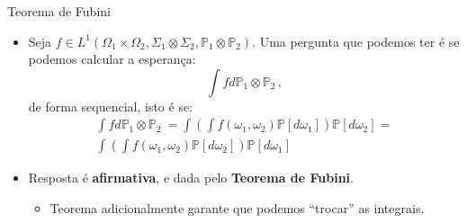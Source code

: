 \documentclass[11pt]{beamer}
\begin{document}
\begin{frame}{Teorema de Fubini}
	\begin{itemize}
	\item Seja $f \in L^1(\Omega_1\times \Omega_2,\Sigma_1 \otimes \Sigma_2,  \mathbb{P}_1\otimes \mathbb{P}_2)$. Uma pergunta que podemos ter é se podemos calcular a esperança:
$$\int f d \mathbb{P}_1 \otimes \mathbb{P}_2\,,$$
de forma sequencial, isto é se:
\begin{equation*}
	\begin{aligned}
		\int f d \mathbb{P}_1 \otimes \mathbb{P}_2\ = \int \left(\int f(\omega_1,\omega_2)\mathbb{P}[d\omega_1]\right) \mathbb{P}[d\omega_2] = \\ \int \left(\int f(\omega_1,\omega_2)\mathbb{P}[d\omega_2]\right) \mathbb{P}[d\omega_1] 
	\end{aligned}
\end{equation*}
\item Resposta é \textbf{afirmativa}, e dada pelo \textbf{Teorema de Fubini}.
\begin{itemize}
	\item Teorema adicionalmente garante que podemos ``trocar'' as integrais.
\end{itemize}
\end{itemize}
\end{frame}
\end{document}
